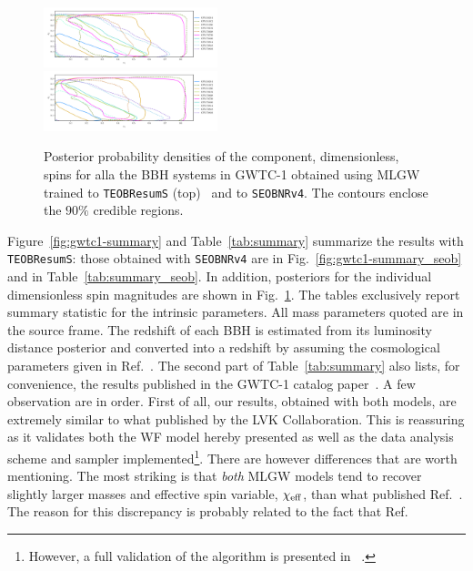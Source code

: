 \begin{figure}[t]
	\centering
    \includegraphics[width=0.45\textwidth]{img/spins.pdf}\\
        \includegraphics[width=0.45\textwidth]{img/spins_seob.pdf}
	\caption{Posterior probability densities of the component, dimensionless, spins for alla the BBH systems in GWTC-1 
	obtained using MLGW trained to {\tt TEOBResumS} (top)~\cite{Nagar:2020pcj}  and to {\tt SEOBNRv4}. 
	The contours enclose the $90\%$ credible regions.}
	\label{fig:gwtc1_eob_spins}
\end{figure}
Figure~\ref{fig:gwtc1-summary} and Table~\ref{tab:summary} summarize the results
with {\tt TEOBResumS}: those obtained with {\tt SEOBNRv4} are in Fig.~\ref{fig:gwtc1-summary_seob}
and in Table~\ref{tab:summary_seob}. In addition, posteriors for the individual dimensionless
spin magnitudes are shown in Fig.~\ref{fig:gwtc1_eob_spins}. The tables exclusively report
summary statistic for the intrinsic parameters. All mass parameters quoted are in the source frame. 
The redshift of each BBH is estimated from its luminosity distance posterior and 
converted into a redshift by assuming the cosmological parameters given in Ref.~\cite{}.
The second part of Table~\ref{tab:summary} also lists, for convenience, the results
published in the GWTC-1 catalog paper~\cite{LIGOScientific:2018mvr}.
A few observation are in order. First of all, our results, obtained with both models,
are extremely similar to what published by the LVK Collaboration. 
This is reassuring as it validates both the WF model hereby presented 
as well as the data analysis scheme and sampler 
implemented\footnote{However, a full validation of the algorithm is presented in ~\cite{}.}.
There are however differences that are worth mentioning. The most striking is that
{\it both} MLGW models tend to recover slightly larger masses and effective 
spin variable, $\chi_{\rm eff}$, than what published Ref.~\cite{LIGOScientific:2018mvr}.
The reason for this discrepancy is probably related to the fact that Ref.~\cite{LIGOScientific:2018mvr}
